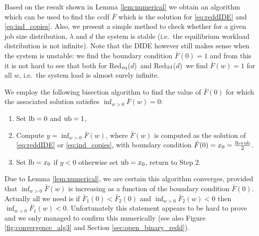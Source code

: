 \documentclass[12pt]{report}
\newcommand{\Redid}{Red$_{\textup{eq}}$($d$)}
\newcommand{\Redind}{Red$_{\textup{iid}}$($d$)}
\begin{document}
Based on the result shown in Lemma \ref{lem:numerical} we obtain an algorithm which can be used to find the ccdf $\bar{F}$ which is the solution  for \eqref{eq:reddIDE} and \eqref{eq:ind_copies}. Also, we present a simple method to check whether for a given job size distribution, $\lambda$ and $d$ the system is stable (i.e.~the equilibrium workload distribution is not infinite). Note that the DIDE however still makes sense when the system is unstable: we find the boundary condition $\bar F(0)=1$ and from this it is not hard to see that both for \Redid\ and \Redind\ we find $\bar F(w) =1$ for all $w$, i.e.~the system load is almost surely infinite.

We employ the following bisection algorithm to find the value of $\bar F(0)$ for which the associated solution satisfies $\inf_{w>0} \bar F(w)=0$:
\begin{enumerate}
\item Set $\textup{lb}=0$ and $\textup{ub}=1$,
\item Compute $y=\inf_{w>0} \bar F(w)$, where $\bar F(w)$ is computed as the solution of \eqref{eq:reddIDE} or \eqref{eq:ind_copies}, with boundary condition $\bar F(0) = x_0 = \frac{\textup{lb} + \textup{ub}}{2}$.
\item Set $\textup{lb}=x_0$ if $y<0$ otherwise set $\textup{ub}=x_0$, return to Step 2.
\end{enumerate}
Due to Lemma \ref{lem:numerical}, we are certain this algorithm converges, provided that $\inf_{w>0} \bar F(w)$ is increasing as a function of the boundary condition $\bar F(0)$. Actually all we need is if $\bar F_1(0) < \bar F_2(0)$ and $\inf_{w>0} \bar F_2(w) < 0$ then $\inf_{w>0} \bar F_1(w) < 0$. Unfortunately this
statement appears to be hard to prove and we only managed to confirm this  numerically 
(see also Figure \ref{fig:convergence_alg3} and Section \ref{sec:open_binary_redd}).
\end{document}
